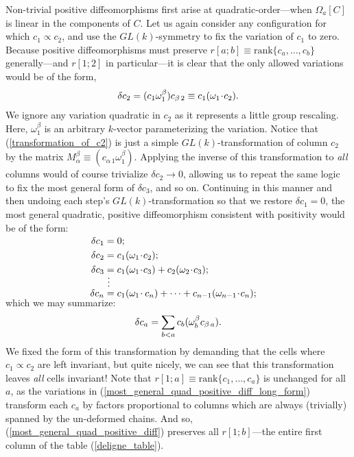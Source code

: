 \documentclass[12pt,hyperref,compress]{JHEP3}
\newcommand{\eq}[1]{\begin{equation}#1\end{equation}}
\newcommand{\eqs}[1]{\begin{equation}\begin{split}#1\end{split}\end{equation}}
\begin{document}
{Non-trivial positive diffeomorphisms first arise at quadratic-order---when $\Omega_a[C]$ is linear in the components of $C$. Let us again consider any configuration for which $c_1\!\propto\!c_2$, and use the $GL(k)$-symmetry to fix the variation of $c_1$ to zero. Because positive diffeomorphisms must preserve $r[a;b]\equiv\mathrm{rank}\{c_a,\ldots,c_b\}$ generally---and $r[1;2]$ in particular---it is clear that the only allowed variations would be of the form,
\vspace{-.2cm}\eq{\delta c_2=(c_1\omega_1^\beta)c_{\beta\,2}\equiv c_1(\omega_1\!\cdot\!c_2).\label{transformation_of_c2}\vspace{-.2cm}}
We ignore any variation quadratic in $c_2$ as it represents  a little group rescaling. Here, $\omega_1^\beta$ is an arbitrary $k$-vector parameterizing the variation. Notice that (\ref{transformation_of_c2}) is just a simple $GL(k)$-transformation of column $c_2$ by the matrix $M_{\alpha}^{\beta}\equiv(c_{\alpha\,1}\omega_1^{\beta})$. Applying the inverse of this transformation to {\it all} columns would of course trivialize $\delta c_2\to 0$, allowing us to repeat the same logic to fix the most general form of $\delta c_3$, and so on. Continuing in this manner and then undoing each step's $GL(k)$-transformation so that we restore $\delta c_1=0$, the most general quadratic, positive diffeomorphism consistent with positivity would be of the form:
\vspace{-.2cm}\eqs{\\[-20pt]\delta c_1&=0;\\\delta c_2&=c_1(\omega_1\!\cdot\! c_2);\\\delta c_3&=c_1(\omega_1\!\cdot\! c_3)+c_2(\omega_2\!\cdot\! c_3);\\[-8pt]&\phantom{\,\,}\vdots\\[-5pt]\delta c_{n}&=c_1(\omega_1\!\cdot c_n)+\cdots+c_{n-1}(\omega_{n-1}\!\cdot\!c_n);\\[-25pt]\vspace{-.2cm}\label{most_general_quad_positive_diff_long_form}}
which we may summarize: \vspace{-.0cm}\eq{\delta c_a=\sum_{b<a}c_b(\omega_b^{\beta}c_{\beta\,a}).\vspace{-.2cm}\label{most_general_quad_positive_diff}}
We fixed the form of this transformation by demanding that the cells where $c_1 \propto c_2$ are left invariant, but quite nicely, we can see that this transformation leaves {\it all} cells invariant! Note that $r[1;a]\equiv\mathrm{rank}\{c_1,\ldots,c_a\}$ is unchanged for all $a$, as the variations in (\ref{most_general_quad_positive_diff_long_form}) transform each $c_{a}$ by factors proportional to columns which are always (trivially) spanned by the un-deformed chains. And so, (\ref{most_general_quad_positive_diff}) preserves all $r[1;b]$---the entire first column of the table (\ref{deligne_table}).

}
\end{document}

